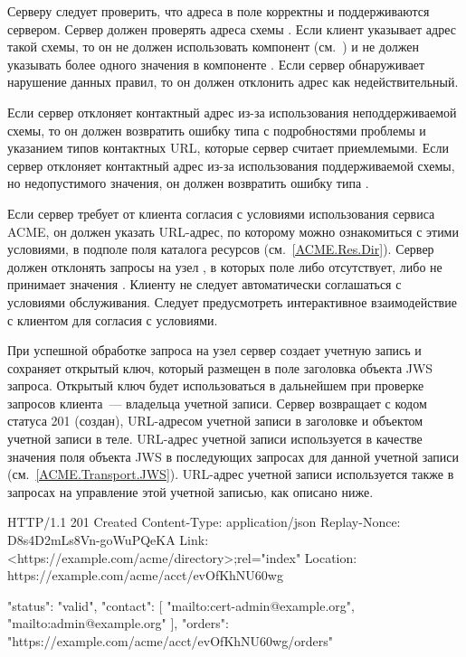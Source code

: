 Серверу следует проверить, что адреса в поле  корректны и 
поддерживаются сервером. Сервер должен проверять адреса схемы . 
Если клиент указывает адрес такой схемы, то он не должен использовать
компонент  (см.~\cite{RFC6068}) и не должен указывать более 
одного значения  в компоненте . 
%
Если сервер обнаруживает нарушение данных правил, то он должен отклонить адрес
как недействительный. 

Если сервер отклоняет контактный адрес из-за использования неподдерживаемой  
схемы, то он должен возвратить ошибку типа  с 
подробностями проблемы и указанием типов контактных URL, которые сервер считает 
приемлемыми. Если сервер отклоняет контактный адрес из-за использования 
поддерживаемой схемы, но недопустимого значения, он должен возвратить ошибку 
типа .  

Если сервер требует от клиента согласия с условиями использования сервиса ACME, 
он должен указать URL-адрес, по которому можно ознакомиться с этими условиями, 
в подполе  поля  каталога ресурсов 
(см.~\ref{ACME.Res.Dir}). Сервер должен отклонять запросы на узел 
, в которых поле  либо отсутствует,
либо не принимает значения . 
%
Клиенту не следует автоматически соглашаться с условиями обслуживания.
Следует предусмотреть интерактивное взаимодействие с клиентом для согласия с 
условиями.

При успешной обработке запроса на узел  сервер создает учетную 
запись и сохраняет открытый ключ, который размещен в поле  заголовка 
объекта JWS запроса. Открытый ключ будет использоваться в дальнейшем при 
проверке запросов клиента~--- владельца учетной записи. 
Сервер возвращает  с кодом статуса 201 
(создан), URL-адресом учетной записи в заголовке  и объектом 
учетной записи в теле.
%
URL-адрес учетной записи используется в качестве значения поля  
объекта JWS в последующих запросах для данной учетной записи 
(см.~\ref{ACME.Transport.JWS}).
%
URL-адрес учетной записи используется также в запросах на управление этой 
учетной записью, как описано ниже. 

\begin{codeblock}
HTTP/1.1 201 Created
Content-Type: application/json
Replay-Nonce: D8s4D2mLs8Vn-goWuPQeKA
Link: <https://example.com/acme/directory>;rel="index"
Location: https://example.com/acme/acct/evOfKhNU60wg

{
  "status": "valid",
  "contact": [
    "mailto:cert-admin@example.org",
    "mailto:admin@example.org"
  ],
  "orders": "https://example.com/acme/acct/evOfKhNU60wg/orders"
}
\end{codeblock}
\fi

